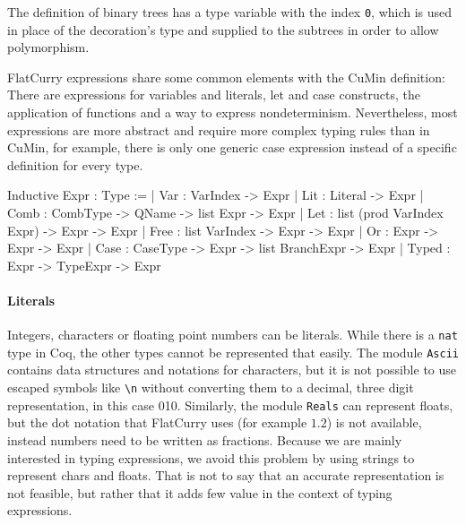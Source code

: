 \documentclass[paper = a4, fleqn, twoside]{scrreprt}
\begin{document}
The definition of binary trees has a type variable with the index \texttt{0}, which is used in place of the decoration's type and supplied to the subtrees in order to allow polymorphism.\\
\par \noindent
FlatCurry expressions share some common elements with the CuMin definition: There are expressions for variables and literals, let and case constructs, the application of functions and a way to express nondeterminism. Nevertheless, most expressions are more abstract and require more complex typing rules than in CuMin, for example, there is only one generic case expression instead of a specific definition for every type.
\begin{coqcode}
Inductive Expr : Type := 
  | Var   : VarIndex -> Expr
  | Lit   : Literal -> Expr
  | Comb  : CombType -> QName -> list Expr -> Expr
  | Let   : list (prod VarIndex Expr) -> Expr -> Expr
  | Free  : list VarIndex -> Expr -> Expr
  | Or    : Expr -> Expr -> Expr
  | Case  : CaseType -> Expr -> list BranchExpr -> Expr
  | Typed : Expr -> TypeExpr -> Expr
\end{coqcode}
\paragraph{Literals}
Integers, characters or floating point numbers can be literals. While there is a \texttt{nat} type in Coq, the other types cannot be represented that easily. The module \texttt{Ascii} contains data structures and notations for characters, but it is not possible to use escaped symbols like \texttt{\textbackslash n} without converting them to a decimal, three digit representation, in this case 010. Similarly, the module \texttt{Reals} can represent floats, but the dot notation that FlatCurry uses (for example $1.2$) is not available, instead numbers need to be written as fractions. Because we are mainly interested in typing expressions, we avoid this problem by using strings to represent chars and floats. That is not to say that an accurate representation is not feasible, but rather that it adds few value in the context of typing expressions. 
\end{document}

